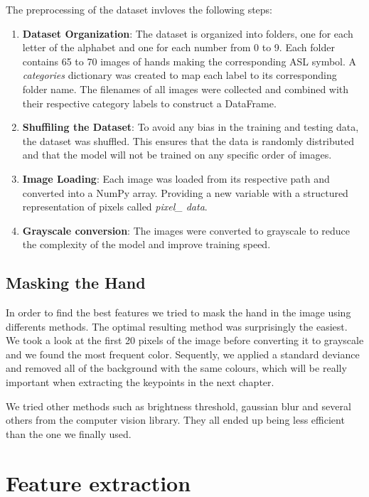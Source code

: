 \documentclass[9pt,a4paper,twoside]{tau-class/tau}
\begin{document}
    The preprocessing of the dataset invloves the following steps: 
    \begin{enumerate}
        \item \textbf{Dataset Organization}: The dataset is organized into folders, one for each letter of the alphabet and one for each number from 0 to 9. Each folder contains 65 to 70 images of hands making the corresponding ASL symbol. A \textit{categories} dictionary was created to map each label to its corresponding folder name. The filenames of all images were collected and combined with their respective category labels to construct a DataFrame.
        \item \textbf{Shuffiling the Dataset}: To avoid any bias in the training and testing data, the dataset was shuffled. This ensures that the data is randomly distributed and that the model will not be trained on any specific order of images.
        \item \textbf{Image Loading}: Each image was loaded from its respective path and converted into a NumPy array. Providing a new variable with a structured representation of pixels called \textit{pixel\_ data}.
        \item \textbf{Grayscale conversion}: The images were converted to grayscale to reduce the complexity of the model and improve training speed.
    \end{enumerate}


    \subsection{Masking the Hand}
    In order to find the best features we tried to mask the hand in the image using differents methods. The optimal resulting
    method was surprisingly the easiest. We took a look at the first 20 pixels of the image before converting it to grayscale and we found the most frequent color. Sequently, we applied a
    standard deviance and removed all of the background with the same colours, which will be really important when extracting the keypoints in the next chapter.
    \begin{info}
        We tried other methods such as brightness threshold, gaussian blur and several others from the computer vision library. They all ended up 
        being less efficient than the one we finally used.
    \end{info}
		
\section{Feature extraction} \label{sec:table}
\end{document}
